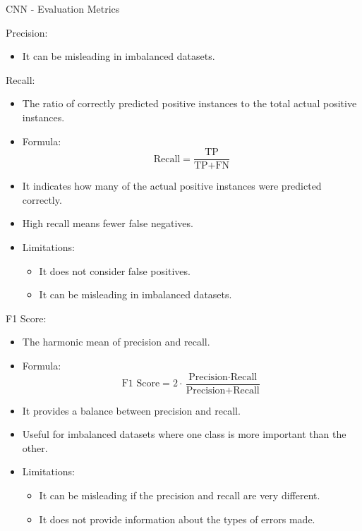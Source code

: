 \begin{frame}{CNN - Evaluation Metrics}
\begin{block}{Precision:}
\begin{itemize}
\begin{itemize}
                \item It can be misleading in imbalanced datasets.
            \end{itemize}
    \end{itemize}
\end{block}
\framebreak
\begin{block}{Recall:}
    \begin{itemize}
        \item The ratio of correctly predicted positive instances to the total actual positive instances.
        \item Formula: 
            \[
            \text{Recall} = \frac{\text{TP}}{\text{TP} + \text{FN}}
            \]
        \item It indicates how many of the actual positive instances were predicted correctly.
        \item High recall means fewer false negatives.
        \item Limitations:
            \begin{itemize}
                \item It does not consider false positives.
                \item It can be misleading in imbalanced datasets.
            \end{itemize}
    \end{itemize}
\end{block}
\framebreak
\begin{block}{F1 Score:}
    \begin{itemize}
        \item The harmonic mean of precision and recall.
        \item Formula: 
            \[
            \text{F1 Score} = 2 \cdot \frac{\text{Precision} \cdot \text{Recall}}{\text{Precision} + \text{Recall}}
            \]
        \item It provides a balance between precision and recall.
        \item Useful for imbalanced datasets where one class is more important than the other.
        \item Limitations:
            \begin{itemize}
                \item It can be misleading if the precision and recall are very different.
                \item It does not provide information about the types of errors made.
            \end{itemize}

\end{itemize}
\end{block}
\end{frame}
